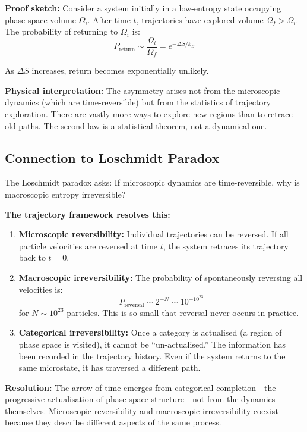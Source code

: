 \textbf{Proof sketch:} Consider a system initially in a low-entropy state occupying phase space volume $\Omega_i$. After time $t$, trajectories have explored volume $\Omega_f > \Omega_i$. The probability of returning to $\Omega_i$ is:
\begin{equation}
P_{\text{return}} \sim \frac{\Omega_i}{\Omega_f} = e^{-\Delta S/k_B}
\end{equation}

As $\Delta S$ increases, return becomes exponentially unlikely.

\textbf{Physical interpretation:} The asymmetry arises not from the microscopic dynamics (which are time-reversible) but from the statistics of trajectory exploration. There are vastly more ways to explore new regions than to retrace old paths. The second law is a statistical theorem, not a dynamical one.

\subsection{Connection to Loschmidt Paradox}

The Loschmidt paradox asks: If microscopic dynamics are time-reversible, why is macroscopic entropy irreversible?

\textbf{The trajectory framework resolves this:}

\begin{enumerate}
\item \textbf{Microscopic reversibility:} Individual trajectories can be reversed. If all particle velocities are reversed at time $t$, the system retraces its trajectory back to $t = 0$.

\item \textbf{Macroscopic irreversibility:} The probability of spontaneously reversing all velocities is:
\begin{equation}
P_{\text{reversal}} \sim 2^{-N} \sim 10^{-10^{23}}
\end{equation}
for $N \sim 10^{23}$ particles. This is so small that reversal never occurs in practice.

\item \textbf{Categorical irreversibility:} Once a category is actualised (a region of phase space is visited), it cannot be ``un-actualised.'' The information has been recorded in the trajectory history. Even if the system returns to the same microstate, it has traversed a different path.
\end{enumerate}

\textbf{Resolution:} The arrow of time emerges from categorical completion—the progressive actualisation of phase space structure—not from the dynamics themselves. Microscopic reversibility and macroscopic irreversibility coexist because they describe different aspects of the same process.

